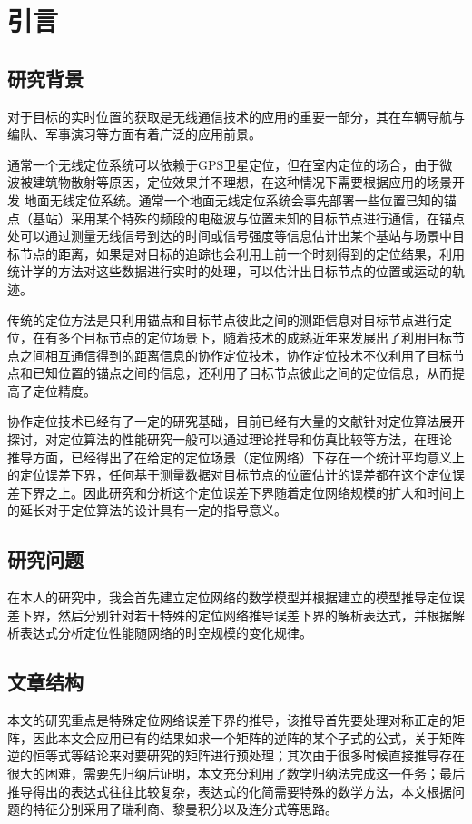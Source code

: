 \chapter{引言}
\label{cha:intro}

\section{研究背景}
对于目标的实时位置的获取是无线通信技术的应用的重要一部分，其在车辆导航与编队、军事演习等方面有着广泛的应用前景。


通常一个无线定位系统可以依赖于GPS卫星定位，但在室内定位的场合，由于微波被建筑物散射等原因，定位效果并不理想，在这种情况下需要根据应用的场景开发
地面无线定位系统。通常一个地面无线定位系统会事先部署一些位置已知的锚点（基站）采用某个特殊的频段的电磁波与位置未知的目标节点进行通信，在锚点处可以通过测量无线信号到达的时间或信号强度等信息估计出某个基站与场景中目标节点的距离，如果是对目标的追踪也会利用上前一个时刻得到的定位结果，利用统计学的方法对这些数据进行实时的处理，可以估计出目标节点的位置或运动的轨迹。


传统的定位方法是只利用锚点和目标节点彼此之间的测距信息对目标节点进行定位，在有多个目标节点的定位场景下，随着技术的成熟近年来发展出了利用目标节点之间相互通信得到的距离信息的协作定位技术，协作定位技术不仅利用了目标节点和已知位置的锚点之间的信息，还利用了目标节点彼此之间的定位信息，从而提高了定位精度。


协作定位技术已经有了一定的研究基础，目前已经有大量的文献针对定位算法展开探讨，对定位算法的性能研究一般可以通过理论推导和仿真比较等方法，在理论
推导方面，已经得出了在给定的定位场景（定位网络）下存在一个统计平均意义上的定位误差下界\cite{LimitBound}，任何基于测量数据对目标节点的位置估计的误差都在这个定位误差下界之上。因此研究和分析这个定位误差下界随着定位网络规模的扩大和时间上的延长对于定位算法的设计具有一定的指导意义。

\section{研究问题}
在本人的研究中，我会首先建立定位网络的数学模型并根据建立的模型推导定位误差下界，然后分别针对若干特殊的定位网络推导误差下界的解析表达式，并根据解析表达式分析定位性能随网络的时空规模的变化规律。

\section{文章结构}
本文的研究重点是特殊定位网络误差下界的推导，该推导首先要处理对称正定的矩阵，因此本文会应用已有的结果如求一个矩阵的逆阵的某个子式的公式，关于矩阵逆的恒等式等结论来对要研究的矩阵进行预处理；其次由于很多时候直接推导存在很大的困难，需要先归纳后证明，本文充分利用了数学归纳法完成这一任务；最后推导得出的表达式往往比较复杂，表达式的化简需要特殊的数学方法，本文根据问题的特征分别采用了瑞利商、黎曼积分以及连分式等思路。
